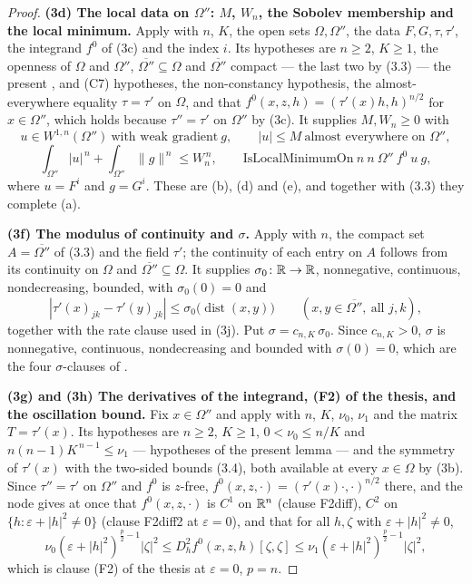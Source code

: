 \begin{proof}
\textbf{(3d) The local data on $\Omega''$: $M$, $W_n$, the Sobolev membership
and the local minimum.}  Apply  with $n$,
$K$, the open sets $\Omega,\Omega''$, the data $F,G,\tau,\tau'$, the integrand
$f^0$ of (3c) and the index $i$.  Its hypotheses are $n\ge2$, $K\ge1$, the
openness of $\Omega$ and $\Omega''$, $\overline{\Omega''}\subseteq\Omega$ and
$\overline{\Omega''}$ compact --- the last two by (3.3) --- the present
,  and (C7) hypotheses,
the non-constancy hypothesis, the almost-everywhere equality $\tau=\tau'$ on
$\Omega$, and that $f^0(x,z,h)=(\tau'(x)h,h)^{n/2}$ for $x\in\Omega''$, which
holds because $\tau''=\tau'$ on $\Omega''$ by (3c).  It supplies
$M,W_n\ge0$ with
\[
u\in W^{1,n}(\Omega'')\ \text{with weak gradient}\ g,\qquad
|u|\le M\ \text{almost everywhere on }\Omega'',
\tag{3.9}
\]
\[
\int_{\Omega''}|u|^{\,n}+\int_{\Omega''}\|g\|^{\,n}\le W_n^{\,n},
\qquad
\mathrm{IsLocalMinimumOn}\ n\ n\ \Omega''\ f^0\ u\ g ,
\tag{3.8}
\]
where $u=F^i$ and $g=G^i$.  These are (b), (d) and (e), and together with (3.3)
they complete (a).

\textbf{(3f) The modulus of continuity and $\sigma$.}  Apply
 with $n$, the compact set
$A=\overline{\Omega''}$ of (3.3) and the field $\tau'$; the continuity of each
entry on $A$ follows from its continuity on $\Omega$ and
$\overline{\Omega''}\subseteq\Omega$.  It supplies $\sigma_0\colon\mathbb{R}\to\mathbb{R}$,
nonnegative, continuous, nondecreasing, bounded, with $\sigma_0(0)=0$ and
\[
|\tau'(x)_{jk}-\tau'(y)_{jk}|\le\sigma_0\bigl(\operatorname{dist}(x,y)\bigr)
\qquad(x,y\in\overline{\Omega''},\ \text{all }j,k),
\tag{3.6}
\]
together with the rate clause used in (3j).  Put $\sigma=c_{n,K}\,\sigma_0$.
Since $c_{n,K}>0$, $\sigma$ is nonnegative, continuous, nondecreasing and
bounded with $\sigma(0)=0$, which are the four $\sigma$-clauses of
.

\textbf{(3g) and (3h) The derivatives of the integrand, (F2) of the thesis, and the
oscillation bound.}  Fix $x\in\Omega''$ and apply
 with $n$, $K$, $\nu_0$, $\nu_1$ and the
matrix $T=\tau'(x)$.  Its hypotheses are $n\ge2$, $K\ge1$,
$0<\nu_0\le n/K$ and $n(n-1)K^{\,n-1}\le\nu_1$ --- hypotheses of the present
lemma --- and the symmetry of $\tau'(x)$ with the two-sided bounds (3.4), both
available at every $x\in\Omega$ by (3b).  Since $\tau''=\tau'$ on $\Omega''$ and
$f^0$ is $z$-free, $f^0(x,z,\cdot)=(\tau'(x)\cdot,\cdot)^{n/2}$ there, and the
node gives at once that $f^0(x,z,\cdot)$ is $C^1$ on $\mathbb{R}^n$ (clause
\textup{F2diff}), $C^2$ on $\{h:\varepsilon+|h|^2\ne0\}$ (clause
\textup{F2diff2} at $\varepsilon=0$), and that for all $h,\zeta$ with
$\varepsilon+|h|^2\ne0$,
\[
\nu_0(\varepsilon+|h|^2)^{\frac p2-1}|\zeta|^2
\le D^2_hf^0(x,z,h)[\zeta,\zeta]
\le\nu_1(\varepsilon+|h|^2)^{\frac p2-1}|\zeta|^2 ,
\]
which is clause (F2) of the thesis at $\varepsilon=0$, $p=n$.


\end{proof}
